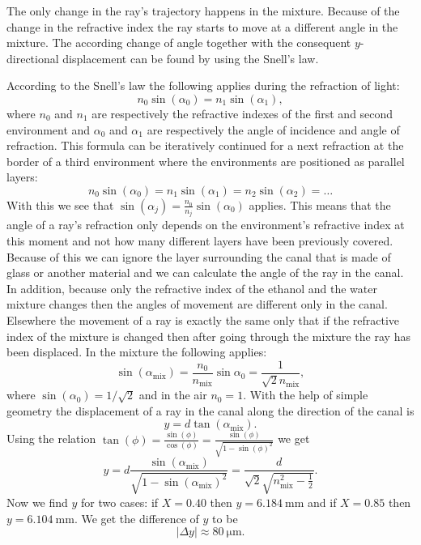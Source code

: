 {\ifEngHint
The only change in the ray’s trajectory happens in the mixture. Because of the change in the refractive index the ray starts to move at a different angle in the mixture. The according change of angle together with the consequent $y$-directional displacement can be found by using the Snell's law.
\fi


\ifEngSolution
According to the Snell’s law the following applies during the refraction of light:
$$n_0\sin(\alpha_0)=n_1\sin(\alpha_1),$$ 
where $n_0$ and $n_1$ are respectively the refractive indexes of the first and second environment and $\alpha_0$ and $\alpha_1$ are respectively the angle of incidence and angle of refraction. This formula can be iteratively continued for a next refraction at the border of a third environment where the environments are positioned as parallel layers:
$$n_0\sin(\alpha_0)=n_1\sin(\alpha_1)=n_2\sin(\alpha_2) = \dots$$ 
With this we see that $\sin(\alpha_j)=\frac{n_0}{n_j}\sin(\alpha_0)$ applies. This means that the angle of a ray’s refraction only depends on the environment’s refractive index at this moment and not how many different layers have been previously covered. Because of this we can ignore the layer surrounding the canal that is made of glass or another material and we can calculate the angle of the ray in the canal. In addition, because only the refractive index of the ethanol and the water mixture changes then the angles of movement are different only in the canal. Elsewhere the movement of a ray is exactly the same only that if the refractive index of the mixture is changed then after going through the mixture the ray has been displaced. In the mixture the following applies:
$$\sin(\alpha_{\text{mix}})=\frac{n_0}{n_{\text{mix}}}\sin{\alpha_0} = \frac{1}{\sqrt{2}n_{\text{mix}}},$$ 
where $\sin(\alpha_0) = 1/\sqrt{2}$ and in the air $n_0=1$. With the help of simple geometry the displacement of a ray in the canal along the direction of the canal is 
$$y=d\tan(\alpha_{\text{mix}}).$$ 
Using the relation $\tan(\phi) = \frac{\sin(\phi)}{\cos(\phi)} = \frac{\sin(\phi)}{\sqrt{1-\sin(\phi)^2}}$ we get 
$$y = d \frac{\sin(\alpha_{\text{mix}})}{\sqrt{1-\sin(\alpha_{\text{mix}})^2}} = \frac{d}{\sqrt{2}\sqrt{n_{\text{mix}}^2-\frac12}}.$$ 
Now we find $y$ for two cases: if $X=\num{0.40}$ then $y=\SI{6.184}{\milli\meter}$ and if $X=\num{0.85}$ then $y=\SI{6.104}{\milli\meter}$. We get the difference of $y$ to be
$$|\Delta y| \approx \SI{80}{\micro\meter}.$$
\fi
}